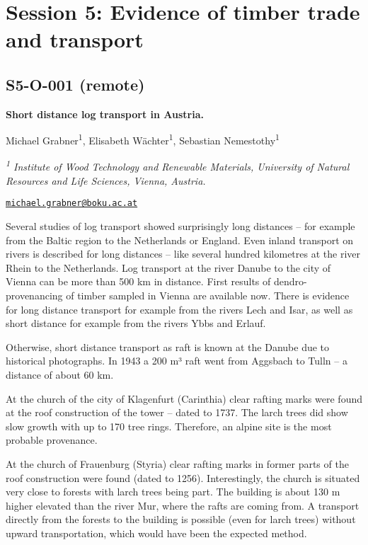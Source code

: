 \documentclass[
]{book}
\begin{document}
\hypertarget{session-5-evidence-of-timber-trade-and-transport}{%
\chapter*{Session 5: Evidence of timber trade and transport}\label{session-5-evidence-of-timber-trade-and-transport}}

\hypertarget{s5-o-001-remote}{%
\section*{S5-O-001 (remote)}\label{s5-o-001-remote}}

\textbf{Short distance log transport in Austria.}

Michael Grabner\textsuperscript{1}, Elisabeth Wächter\textsuperscript{1}, Sebastian Nemestothy\textsuperscript{1}

\emph{\textsuperscript{1} Institute of Wood Technology and Renewable Materials, University of Natural Resources and Life Sciences, Vienna, Austria.}

\href{mailto:michael.grabner@boku.ac.at}{\nolinkurl{michael.grabner@boku.ac.at}}

Several studies of log transport showed surprisingly long distances -- for example from the Baltic region to the Netherlands or England. Even inland transport on rivers is described for long distances -- like several hundred kilometres at the river Rhein to the Netherlands. Log transport at the river Danube to the city of Vienna can be more than 500 km in distance. First results of dendro-provenancing of timber sampled in Vienna are available now. There is evidence for long distance transport for example from the rivers Lech and Isar, as well as short distance for example from the rivers Ybbs and Erlauf.

Otherwise, short distance transport as raft is known at the Danube due to historical photographs. In 1943 a 200 m³ raft went from Aggsbach to Tulln -- a distance of about 60 km.

At the church of the city of Klagenfurt (Carinthia) clear rafting marks were found at the roof construction of the tower -- dated to 1737. The larch trees did show slow growth with up to 170 tree rings. Therefore, an alpine site is the most probable provenance.

At the church of Frauenburg (Styria) clear rafting marks in former parts of the roof construction were found (dated to 1256). Interestingly, the church is situated very close to forests with larch trees being part. The building is about 130 m higher elevated than the river Mur, where the rafts are coming from. A transport directly from the forests to the building is possible (even for larch trees) without upward transportation, which would have been the expected method.
\end{document}

